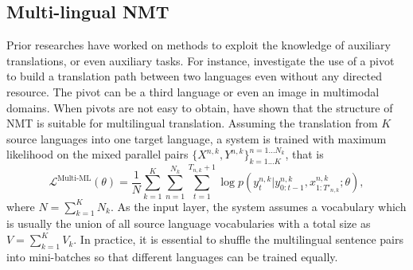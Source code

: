 \subsection{Multi-lingual NMT}
Prior researches have worked on methods to exploit the knowledge of auxiliary translations, or even auxiliary tasks. For instance, \citet{cheng2016neural,chen2017teacher,lee2017emergent,chen2018zero} investigate the use of a pivot to build a translation path between two languages even without any directed resource. The pivot can be a third language or even an image in multimodal domains. When pivots are not easy to obtain, \citet{firat2016multi,lee2016fully,johnson2016google} have shown that the structure of NMT is suitable for multilingual translation. %
Assuming the translation from $K$ source languages into one target language, a  system is trained with maximum likelihood on the mixed parallel pairs $\{X^{n, k}, Y^{n, k}\}_{k=1 ... K}^{n=1 ... N_k}$, that is
\begin{equation}
	\mathcal{L}^{\text{Multi-ML}}\left(\theta\right)=\frac{1}{N}\sum_{k=1}^{K}\sum_{n=1}^{N_k} \sum_{t=1}^{T_{n, k}+1} \log p(y_t^{n,k}| y_{0:t-1}^{n,k}, x_{1:T'_{n,k}}^{n,k}; \theta),
\end{equation}
where $N=\sum_{k=1}^K N_k$. As the input layer, the system assumes a vocabulary which is usually the union of all  source language vocabularies with a total size as $V=\sum_{k=1}^K V_k$. In practice, it is essential to shuffle the multilingual sentence pairs into mini-batches so that different languages can be trained equally.

